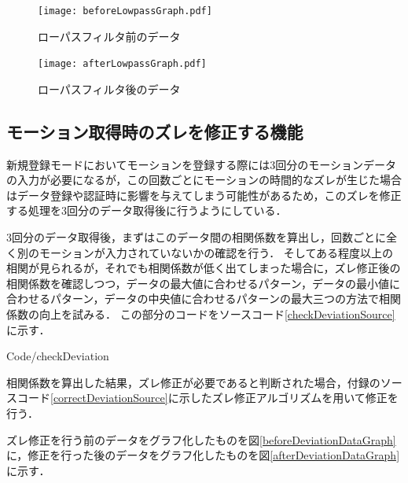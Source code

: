 \documentclass[11pt]{jreport}
\renewcommand{\slash}{/}
\begin{document}
        \begin{figure}[!bhtp]
            \begin{minipage}{0.5\hsize}
                \begin{center}
                    \texttt{[image: beforeLowpassGraph.pdf]}
                \end{center}
                \caption{ローパスフィルタ前のデータ}
                \label{beforeLowpassDataGraph}
            \end{minipage}
            \begin{minipage}{0.5\hsize}
                \begin{center}
                    \texttt{[image: afterLowpassGraph.pdf]}
                \end{center}
                \caption{ローパスフィルタ後のデータ}
                \label{afterLowpassDataGraph}
            \end{minipage}
        \end{figure}

        \subsection{モーション取得時のズレを修正する機能}
        新規登録モードにおいてモーションを登録する際には3回分のモーションデータの入力が必要になるが，この回数ごとにモーションの時間的なズレが生じた場合はデータ登録や認証時に影響を与えてしまう可能性があるため，このズレを修正する処理を3回分のデータ取得後に行うようにしている．

        3回分のデータ取得後，まずはこのデータ間の相関係数を算出し，回数ごとに全く別のモーションが入力されていないかの確認を行う．
        そしてある程度以上の相関が見られるが，それでも相関係数が低く出てしまった場合に，ズレ修正後の相関係数を確認しつつ，データの最大値に合わせるパターン，データの最小値に合わせるパターン，データの中央値に合わせるパターンの最大三つの方法で相関係数の向上を試みる．
        この部分のコードをソースコード\ref{checkDeviationSource}に示す．

        
        {Code\slash checkDeviation}

        相関係数を算出した結果，ズレ修正が必要であると判断された場合，付録のソースコード\ref{correctDeviationSource}に示したズレ修正アルゴリズムを用いて修正を行う．

        ズレ修正を行う前のデータをグラフ化したものを図\ref{beforeDeviationDataGraph}に，修正を行った後のデータをグラフ化したものを図\ref{afterDeviationDataGraph}に示す．
\end{document}
